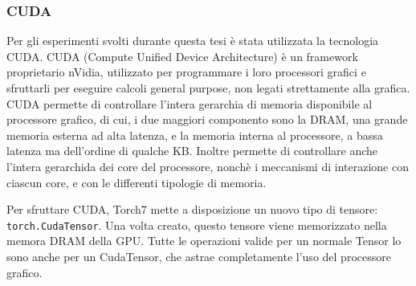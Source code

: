 \subsubsection{CUDA}

Per gli esperimenti svolti durante questa tesi \`e stata utilizzata la tecnologia
CUDA. CUDA (Compute Unified Device Architecture) \`e un framework proprietario
nVidia, utilizzato per programmare i loro processori grafici e sfruttarli per
eseguire calcoli general purpose, non legati strettamente alla grafica. CUDA
permette di controllare l'intera gerarchia di memoria disponibile al processore
grafico, di cui, i due maggiori componento sono la DRAM, una grande memoria esterna
ad alta latenza, e la memoria interna al processore, a bassa latenza ma dell'ordine
di qualche KB. Inoltre permette di controllare anche l'intera gerarchida dei core
del processore, nonch\`e i meccanismi di interazione con ciascun core, e con le
differenti tipologie di memoria.

Per sfruttare CUDA, Torch7 mette a disposizione un nuovo tipo di tensore:
\lstinline[language={[5.0]Lua}]|torch.CudaTensor|.
Una volta creato, questo tensore viene memorizzato nella memora DRAM della GPU.
Tutte le operazioni valide per un normale Tensor lo sono anche per un CudaTensor,
che astrae completamente l'uso del processore grafico.
